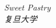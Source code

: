     

    \begin{flushright}
        \textit{Sweet Pastry} \\[1em]
        \textit{复旦大学}
    \end{flushright}